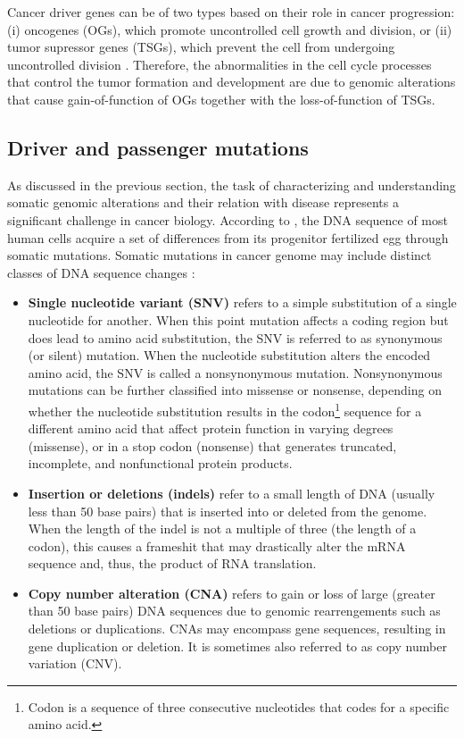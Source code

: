 Cancer driver genes can be of two types based on their role in cancer progression: (i) oncogenes (OGs), which promote uncontrolled cell growth and division, or (ii) tumor supressor genes (TSGs), which prevent the cell from undergoing uncontrolled division \cite{Chandrashekar2020}. Therefore, the abnormalities in the cell cycle processes that control the tumor formation and development are due to genomic alterations that cause gain-of-function of OGs together with the loss-of-function of TSGs.


\subsection{Driver and passenger mutations}

As discussed in the previous section, the task of characterizing and understanding somatic genomic alterations and their relation with disease represents a significant challenge in cancer biology. According to \citet{stratton2009cancer}, the DNA sequence of most human cells acquire a set of differences from its progenitor fertilized egg through somatic mutations. %
Somatic mutations in cancer genome may include distinct classes of DNA sequence changes \cite{stratton2009cancer}:
\begin{itemize}
    \item \textbf{Single nucleotide variant (SNV)} refers to a simple substitution of a single nucleotide for another. When this point mutation affects a coding region but does lead to amino acid substitution, the SNV is referred to as synonymous (or silent) mutation. When the nucleotide substitution alters the encoded amino acid, the SNV is called a nonsynonymous mutation. Nonsynonymous mutations can be further classified into missense or nonsense, depending on whether the nucleotide substitution results in the codon\footnote{Codon is a sequence of three consecutive nucleotides that codes for a specific amino acid.} sequence for a different amino acid that affect protein function in varying degrees (missense), or in a stop codon (nonsense) that generates truncated, incomplete, and nonfunctional protein products.

    \item \textbf{Insertion or deletions (indels)} refer to a small length of DNA (usually less than 50 base pairs) that is inserted into or deleted from the genome. When the length of the indel is not a multiple of three (\ie the length of a codon), this causes a frameshit that may drastically alter the mRNA sequence and, thus, the product of RNA translation.
    
    \item \textbf{Copy number alteration (CNA)} refers to gain or loss of large (greater than 50 base pairs) DNA sequences due to genomic rearrengements such as deletions or duplications. CNAs may encompass gene sequences, resulting in gene duplication or deletion. It is sometimes also referred to as copy number variation (CNV).
    
    
\end{itemize}

